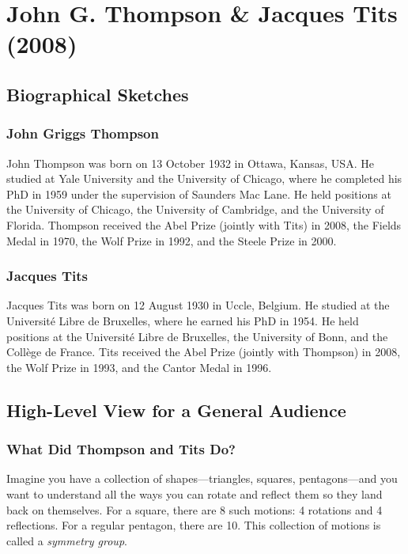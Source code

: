 \chapter{John G. Thompson \& Jacques Tits (2008)}

\section{Biographical Sketches}



\subsection{John Griggs Thompson}

John Thompson was born on 13 October 1932 in Ottawa, Kansas, USA. He studied at Yale University and the University of Chicago, where he completed his PhD in 1959 under the supervision of Saunders Mac Lane. He held positions at the University of Chicago, the University of Cambridge, and the University of Florida. Thompson received the Abel Prize (jointly with Tits) in 2008, the Fields Medal in 1970, the Wolf Prize in 1992, and the Steele Prize in 2000.

\subsection{Jacques Tits}

Jacques Tits was born on 12 August 1930 in Uccle, Belgium. He studied at the Universit\'e Libre de Bruxelles, where he earned his PhD in 1954. He held positions at the Universit\'e Libre de Bruxelles, the University of Bonn, and the Coll\`ege de France. Tits received the Abel Prize (jointly with Thompson) in 2008, the Wolf Prize in 1993, and the Cantor Medal in 1996.

\section{High-Level View for a General Audience}

\subsection{What Did Thompson and Tits Do?}

Imagine you have a collection of shapes---triangles, squares, pentagons---and you want to understand all the ways you can rotate and reflect them so they land back on themselves. For a square, there are 8 such motions: 4 rotations and 4 reflections. For a regular pentagon, there are 10. This collection of motions is called a \emph{symmetry group}.

